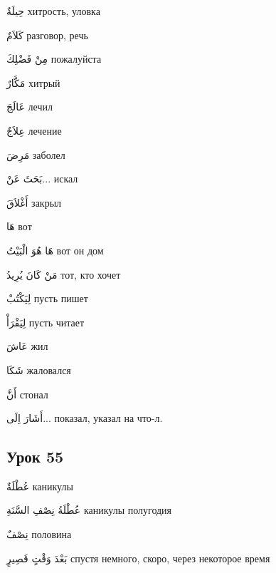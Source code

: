\documentclass[a5paper]{article}
\newcommand\textstyleDropCaps[1]{#1}
\newcommand\textstyleCaptioncharacters[1]{#1}
\begin{document}
\textstyleCaptioncharacters{حِيلَةٌ }\textstyleDropCaps{хитрость, уловка‎}

\textstyleCaptioncharacters{كَلاَمٌ }\textstyleDropCaps{разговор, речь‎}

\textstyleCaptioncharacters{مِنْ فَضْلِكَ }\textstyleDropCaps{пожалуйста‎}

\textstyleCaptioncharacters{مَكَّارٌ }\textstyleDropCaps{хитрый‎}

\textstyleCaptioncharacters{عَالَجَ }\textstyleDropCaps{лечил‎}

\textstyleCaptioncharacters{عِلاَجٌ }\textstyleDropCaps{лечение‎}

\textstyleCaptioncharacters{مَرِضَ }\textstyleDropCaps{заболел‎}

\textstyleCaptioncharacters{بَحَثَ عَنْ...ِ }\textstyleDropCaps{искал‎}

\textstyleCaptioncharacters{أَغْلاَقَ }\textstyleDropCaps{закрыл‎}

\textstyleCaptioncharacters{هَا }\textstyleDropCaps{вот‎}

\textstyleCaptioncharacters{هَا هُوَ الْبَيْتُ }\textstyleDropCaps{вот он дом‎}

\textstyleCaptioncharacters{مَنْ كَانَ يُرِيدُ }\textstyleDropCaps{тот, кто хочет‎}

\textstyleCaptioncharacters{لِيَكْتُبْ }\textstyleDropCaps{пусть пишет‎}

\textstyleCaptioncharacters{لِيَقْرَأْ }\textstyleDropCaps{пусть читает‎}

\textstyleCaptioncharacters{عَاشَ }\textstyleDropCaps{жил‎}

\textstyleCaptioncharacters{شَكَا }\textstyleDropCaps{жаловался‎}

\textstyleCaptioncharacters{أَنَّ }\textstyleDropCaps{стонал‎}

\textstyleCaptioncharacters{أَشَارَ اِلَى...ِ }\textstyleDropCaps{показал, ука­зал на что-л.‎}

\subsection[Урок 55‎]{\textstyleDropCaps{Урок 55‎}}
\textstyleCaptioncharacters{عُطْلَةٌ }\textstyleDropCaps{каникулы‎}

\textstyleCaptioncharacters{عُطْلَةُ نِصْفِ السَّنَةِ }\textstyleDropCaps{ка­никулы полугодия‎}

\textstyleCaptioncharacters{نِصْفٌ }\textstyleDropCaps{половина‎}

\textstyleCaptioncharacters{بَعْدَ وَقْتٍ قَصِيرٍ }\textstyleDropCaps{спустя немного, скоро, через некоторое время‎}
\end{document}
